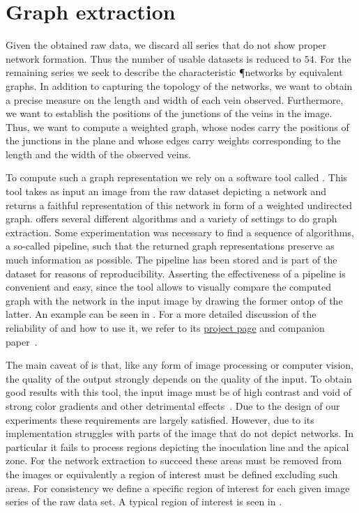 	\section{Graph extraction}

		Given the obtained raw data, we discard all series that do not show proper network formation. Thus the number of usable datasets is reduced to $54$. For the remaining series we seek to describe the characteristic \P networks by equivalent graphs. In addition to capturing the topology of the networks, we want to obtain a precise measure on the length and width of each vein observed. Furthermore, we want to establish the positions of the junctions of the veins in the image. Thus, we want to compute a weighted graph, whose nodes carry the positions of the junctions in the plane and whose edges carry weights corresponding to the length and the width of the observed veins. 

		To compute such a graph representation we rely on a software tool called \NEFI. This tool takes as input an image from the raw dataset depicting a network and returns a faithful representation of this network in form of a weighted undirected graph. \NEFI offers several different algorithms and a variety of settings to do graph extraction. Some experimentation was necessary to find a sequence of algorithms, a so-called pipeline, such that the returned graph representations preserve as much information as possible. The pipeline has been stored and is part of the dataset for reasons of reproducibility. Asserting the effectiveness of a pipeline is convenient and easy, since the tool allows to visually compare the computed graph with the network in the input image by drawing the former ontop of the latter. An example can be seen in . For a more detailed discussion of the reliability of \NEFI and how to use it, we refer to its \href{http://nefi.mpi-inf.mpg.de}{project page} and companion paper~\cite{dirnberger2015nefi}.

		The main caveat of \NEFI is that, like any form of image processing or computer vision, the quality of the output strongly depends on the quality of the input. To obtain good results with this tool, the input image must be of high contrast and void of strong color gradients and other detrimental effects~\cite{dirnberger2015nefi}. Due to the design of our experiments these requirements are largely satisfied. However, due to its implementation \NEFI struggles with parts of the image that do not depict networks. In particular it fails to process regions depicting the inoculation line and the apical zone. For the network extraction to succeed these areas must be removed from the images or equivalently a region of interest must be defined excluding such areas. For consistency we define a specific region of interest for each given image series of the raw data set. A typical region of interest is seen in .

